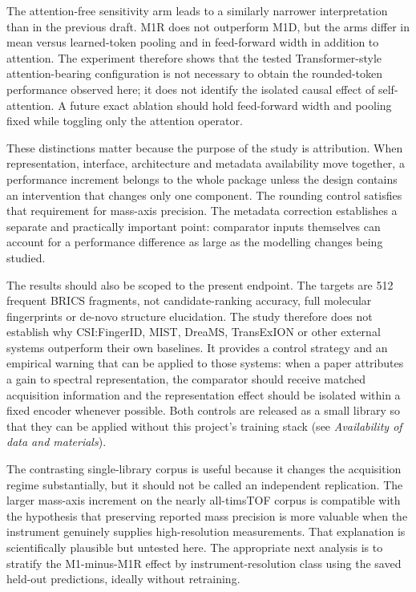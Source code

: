 \documentclass[11pt]{article}
\begin{document}
The attention-free sensitivity arm leads to a similarly narrower interpretation than in the previous draft. M1R does not outperform M1D, but the arms differ in mean versus learned-token pooling and in feed-forward width in addition to attention. The experiment therefore shows that the tested Transformer-style attention-bearing configuration is not necessary to obtain the rounded-token performance observed here; it does not identify the isolated causal effect of self-attention. A future exact ablation should hold feed-forward width and pooling fixed while toggling only the attention operator.

These distinctions matter because the purpose of the study is attribution. When representation, interface, architecture and metadata availability move together, a performance increment belongs to the whole package unless the design contains an intervention that changes only one component. The rounding control satisfies that requirement for mass-axis precision. The metadata correction establishes a separate and practically important point: comparator inputs themselves can account for a performance difference as large as the modelling changes being studied.

The results should also be scoped to the present endpoint. The targets are 512 frequent BRICS fragments, not candidate-ranking accuracy, full molecular fingerprints or de-novo structure elucidation. The study therefore does not establish why CSI:FingerID, MIST, DreaMS, TransExION or other external systems outperform their own baselines. It provides a control strategy and an empirical warning that can be applied to those systems: when a paper attributes a gain to spectral representation, the comparator should receive matched acquisition information and the representation effect should be isolated within a fixed encoder whenever possible. Both controls are released as a small library so that they can be applied without this project's training stack (see \emph{Availability of data and materials}).

The contrasting single-library corpus is useful because it changes the acquisition regime substantially, but it should not be called an independent replication. The larger mass-axis increment on the nearly all-timsTOF corpus is compatible with the hypothesis that preserving reported mass precision is more valuable when the instrument genuinely supplies high-resolution measurements. That explanation is scientifically plausible but untested here. The appropriate next analysis is to stratify the M1-minus-M1R effect by instrument-resolution class using the saved held-out predictions, ideally without retraining.
\end{document}
